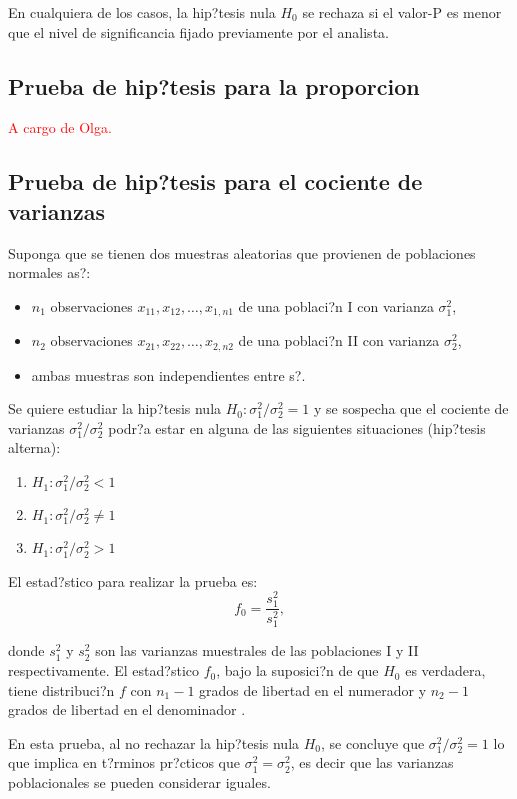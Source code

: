 \documentclass[]{comunicaciones}
\begin{document}
En cualquiera de los casos, la hip?tesis nula $H_0$ se rechaza si el valor-P es menor que el nivel de significancia fijado previamente por el analista.

\subsection{Prueba de hip?tesis para la proporcion}
\textcolor{red}{A cargo de Olga.}

\subsection{Prueba de hip?tesis para el cociente de varianzas}\label{phvars}
Suponga que se tienen dos muestras aleatorias que provienen de poblaciones normales as?:
\begin{itemize}[noitemsep, nolistsep]
	\item $n_1$ observaciones $x_{11}, x_{12}, \ldots, x_{1,n1}$ de una poblaci?n I con  varianza $\sigma^2_1$, 
	\item $n_2$ observaciones $x_{21}, x_{22}, \ldots, x_{2,n2}$ de una poblaci?n II con varianza $\sigma^2_2$,
	\item ambas muestras son independientes entre s?.
\end{itemize}
Se quiere estudiar la hip?tesis nula $H_0: \sigma_1^2 / \sigma_2^2 = 1$ y se sospecha que el cociente de varianzas $\sigma_1^2 / \sigma_2^2$ podr?a estar en alguna de las siguientes situaciones (hip?tesis alterna):
\begin{enumerate}
	\item $H_1: \sigma_1^2 / \sigma_2^2 < 1$
	\item $H_1: \sigma_1^2 / \sigma_2^2 \neq 1$
	\item $H_1: \sigma_1^2 / \sigma_2^2 > 1$
\end{enumerate}
El estad?stico para realizar la prueba es:
$$f_0=\frac{s_1^2}{s_1^2},$$

donde $s_1^2$ y $s_2^2$ son las varianzas muestrales de las poblaciones I y II respectivamente. El estad?stico $f_0$, bajo la suposici?n de que $H_0$ es verdadera, tiene distribuci?n $f$ con $n_1-1$ grados de libertad en el numerador y $n_2-1$ grados de libertad en el denominador \cite{Devore16}.

En esta prueba, al no rechazar la hip?tesis nula $H_0$, se concluye que $\sigma_1^2 / \sigma_2^2 = 1$ lo que implica en t?rminos pr?cticos que $\sigma_1^2 = \sigma_2^2$, es decir que las varianzas poblacionales se pueden considerar iguales.
\end{document}
